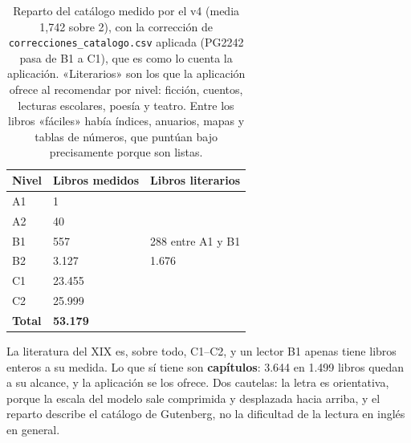\documentclass[11pt,a4paper]{article}
\newcommand{\cod}[1]{\texttt{\small #1}}
\begin{document}
\begin{table}[htbp]
\centering
\small
\begin{tabular}{@{}l R{2.4cm} R{3.2cm}@{}}
\toprule
\textbf{Nivel} & \textbf{Libros medidos} & \textbf{Libros literarios} \\
\midrule
A1 & 1 & \\
A2 & 40 & \\
B1 & 557 & 288 entre A1 y B1 \\
B2 & 3.127 & 1.676 \\
C1 & 23.455 & \\
C2 & 25.999 & \\
\midrule
\textbf{Total} & \textbf{53.179} & \\
\bottomrule
\end{tabular}
\caption{Reparto del catálogo medido por el v4 (media 1,742 sobre 2), con la corrección de \cod{correcciones\_catalogo.csv} aplicada
(PG2242 pasa de B1 a C1), que es como lo cuenta la aplicación. «Literarios» son los
que la aplicación ofrece al recomendar por nivel: ficción, cuentos, lecturas escolares,
poesía y teatro. Entre los libros «fáciles» había índices, anuarios, mapas y tablas de
números, que puntúan bajo precisamente porque son listas.}
\label{cuad:catalogomedido}
\end{table}

La literatura del XIX es, sobre todo, C1--C2, y un lector B1 apenas tiene libros enteros a
su medida. Lo que sí tiene son \textbf{capítulos}: 3.644 en 1.499 libros quedan a su
alcance, y la aplicación se los ofrece. Dos cautelas: la letra es orientativa, porque la
escala del modelo sale comprimida y desplazada hacia arriba, y el reparto describe el
catálogo de Gutenberg, no la dificultad de la lectura en inglés en general.
\end{document}
